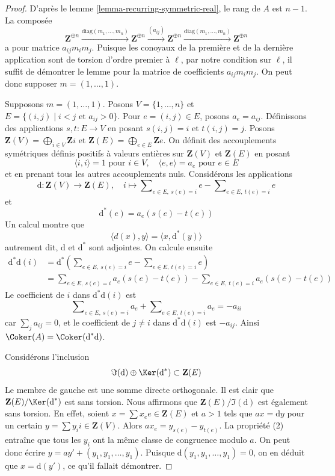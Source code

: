 \begin{proof}
D'après le lemme \ref{lemma-recurring-symmetric-real}, le rang de $A$ est $n - 1$.
La composée
$$
\mathbf{Z}^{\oplus n} \xrightarrow{\text{diag}(m_1, \ldots, m_n)}
\mathbf{Z}^{\oplus n} \xrightarrow{(a_{ij})}
\mathbf{Z}^{\oplus n} \xrightarrow{\text{diag}(m_1, \ldots, m_n)}
\mathbf{Z}^{\oplus n}
$$
a pour matrice $a_{ij}m_im_j$. Puisque les conoyaux de la première et de la dernière
application sont de torsion d'ordre premier à $\ell$, par notre condition sur $\ell$,
il suffit de démontrer le lemme pour la matrice
de coefficients $a_{ij}m_im_j$. On peut donc supposer $m = (1, \ldots, 1)$.

\medskip\noindent
Supposons $m = (1, \ldots, 1)$. Posons $V = \{1, \ldots, n\}$ et
$E = \{(i, j) \mid i < j\text{ et }a_{ij} > 0\}$. Pour
$e = (i, j) \in E$, posons $a_e = a_{ij}$. Définissons des applications
$s, t : E \to V$ en posant $s(i, j) = i$ et $t(i, j) = j$.
Posons
$\mathbf{Z}(V) = \bigoplus_{i \in V} \mathbf{Z}i$ et
$\mathbf{Z}(E) = \bigoplus_{e \in E} \mathbf{Z}e$.
On définit des accouplements symétriques définis positifs à valeurs entières
sur $\mathbf{Z}(V)$ et $\mathbf{Z}(E)$ en posant
$$
\langle i, i \rangle = 1\text{ pour }i \in V, \quad
\langle e, e \rangle = a_e\text{ pour }e \in E
$$
et en prenant tous les autres accouplements nuls. Considérons les applications
$$
\text{d} : \mathbf{Z}(V) \to \mathbf{Z}(E), \quad
i \longmapsto
\sum\nolimits_{e \in E,\ s(e) = i} e - \sum\nolimits_{e \in E,\ t(e) = i} e
$$
et
$$
\text{d}^*(e) = a_e(s(e) - t(e))
$$
Un calcul montre que
$$
\langle d(x), y\rangle = \langle x, \text{d}^*(y) \rangle
$$
autrement dit, $\text{d}$ et $\text{d}^*$ sont adjointes. On calcule ensuite
\begin{align*}
\text{d}^*\text{d}(i)
& = 
\text{d}^*(
\sum\nolimits_{e \in E,\ s(e) = i} e - \sum\nolimits_{e \in E,\ t(e) = i} e) \\
& =
\sum\nolimits_{e \in E,\ s(e) = i} a_e(s(e) - t(e)) -
\sum\nolimits_{e \in E,\ t(e) = i} a_e(s(e) - t(e))
\end{align*}
Le coefficient de $i$ dans $\text{d}^*\text{d}(i)$ est
$$
\sum\nolimits_{e \in E,\ s(e) = i} a_e +
\sum\nolimits_{e \in E,\ t(e) = i} a_e = - a_{ii}
$$
car $\sum_j a_{ij} = 0$, et le coefficient de
$j \not = i$ dans $\text{d}^*\text{d}(i)$ est $-a_{ij}$.
Ainsi $\Coker(A) = \Coker(\text{d}^*\text{d})$.

\medskip\noindent
Considérons l'inclusion
$$
\Im(\text{d}) \oplus \Ker(\text{d}^*) \subset \mathbf{Z}(E)
$$
Le membre de gauche est une somme directe orthogonale. Il est clair que
$\mathbf{Z}(E)/\Ker(\text{d}^*)$ est sans torsion.
Nous affirmons que $\mathbf{Z}(E)/\Im(\text{d})$ est également sans torsion.
En effet, soient $x = \sum x_e e \in \mathbf{Z}(E)$ et $a > 1$ tels
que $ax = \text{d}y$ pour un certain $y = \sum y_i i \in \mathbf{Z}(V)$.
Alors $a x_e = y_{s(e)} - y_{t(e)}$. La propriété (2) entraîne
que tous les $y_i$ ont la même classe de congruence modulo $a$.
On peut donc écrire $y = a y' + (y_1, y_1, \ldots, y_1)$.
Puisque $\text{d}(y_1, y_1, \ldots, y_1) = 0$, on en déduit
que $x = \text{d}(y')$, ce qu'il fallait démontrer.


\end{proof}
